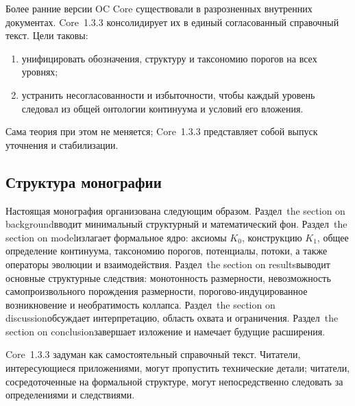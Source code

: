 Более ранние версии OC Core существовали в разрозненных внутренних документах. Core~1.3.3 консолидирует их в единый согласованный справочный текст. Цели таковы:

\begin{enumerate}
    \item унифицировать обозначения, структуру и таксономию порогов на всех уровнях;
    \item устранить несогласованности и избыточности, чтобы каждый уровень следовал из общей онтологии континуума и условий его вложения.
\end{enumerate}

Сама теория при этом не меняется; Core~1.3.3 представляет собой выпуск уточнения и стабилизации.

\subsection{Структура монографии}

Настоящая монография организована следующим образом.
Раздел~the section on backgroundвводит минимальный структурный и математический фон.
Раздел~the section on modelизлагает формальное ядро: аксиомы \(K_0\), конструкцию \(K_1\), общее определение континуума, таксономию порогов, потенциалы, потоки, а также операторы эволюции и взаимодействия.
Раздел~the section on resultsвыводит основные структурные следствия: монотонность размерности, невозможность самопроизвольного порождения размерности, порогово-индуцированное возникновение и необратимость коллапса.
Раздел~the section on discussionобсуждает интерпретацию, область охвата и ограничения.
Раздел~the section on conclusionзавершает изложение и намечает будущие расширения.

Core~1.3.3 задуман как самостоятельный справочный текст. Читатели, интересующиеся приложениями, могут пропустить технические детали; читатели, сосредоточенные на формальной структуре, могут непосредственно следовать за определениями и следствиями.
